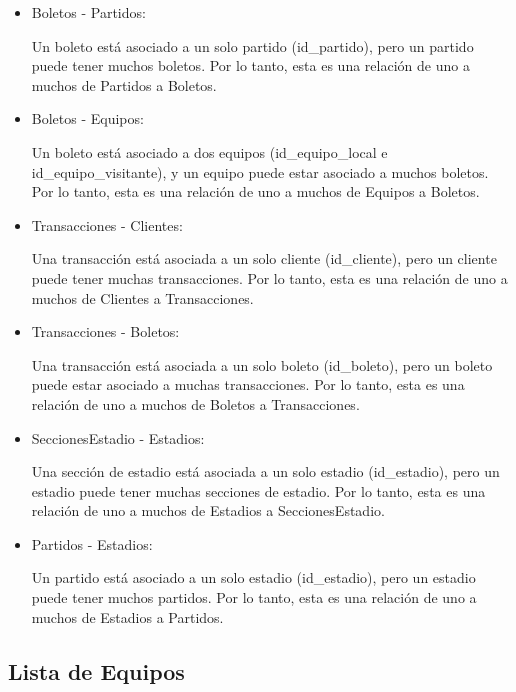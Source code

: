 \begin{itemize}
    \item Boletos - Partidos:
    
        Un boleto está asociado a un solo partido (id_partido), pero un
        partido puede tener muchos boletos. Por lo tanto, esta es una
        relación de uno a muchos de Partidos a Boletos.

    \item Boletos - Equipos: 
    
        Un boleto está asociado a dos equipos (id_equipo_local e
        id_equipo_visitante), y un equipo puede estar asociado a muchos
        boletos. Por lo tanto, esta es una relación de uno a muchos de Equipos a Boletos.

    \item Transacciones - Clientes: 
    
        Una transacción está asociada a un solo cliente (id_cliente), pero
        un cliente puede tener muchas transacciones. Por lo tanto, esta es
        una relación de uno a muchos de Clientes a Transacciones.

    \item Transacciones - Boletos: 
    
        Una transacción está asociada a un solo boleto (id_boleto), pero un
        boleto puede estar asociado a muchas transacciones. Por lo tanto,
        esta es una relación de uno a muchos de Boletos a Transacciones.

    \item SeccionesEstadio - Estadios: 
    
        Una sección de estadio está asociada a un solo estadio (id_estadio),
        pero un estadio puede tener muchas secciones de estadio. Por lo
        tanto, esta es una relación de uno a muchos de Estadios a SeccionesEstadio.

    \item Partidos - Estadios: 
        
        Un partido está asociado a un solo estadio (id_estadio), pero un 
        estadio puede tener muchos partidos. Por lo tanto, esta es una
        relación de uno a muchos de Estadios a Partidos.
\end{itemize}


\subsection*{Lista de Equipos}

